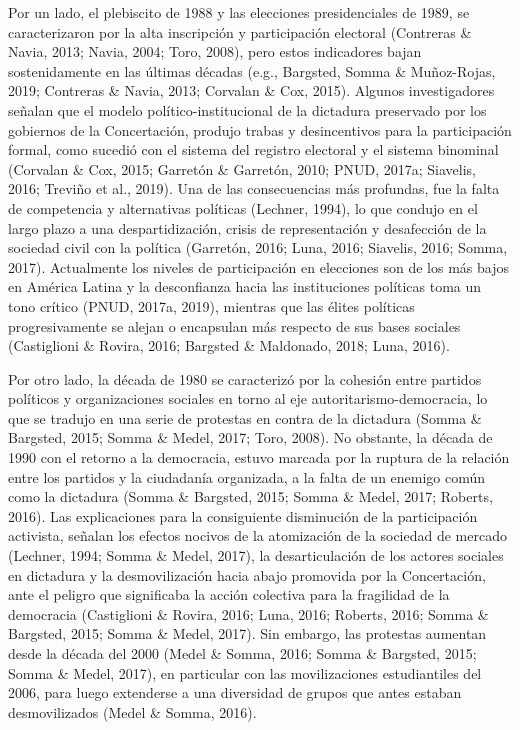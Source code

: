 \documentclass[12pt,twoside]{templates/facsothesis}
\begin{document}
Por un lado, el plebiscito de 1988 y las elecciones presidenciales de 1989, se caracterizaron por la alta inscripción y participación electoral (Contreras \& Navia, 2013; Navia, 2004; Toro, 2008), pero estos indicadores bajan sostenidamente en las últimas décadas (e.g., Bargsted, Somma \& Muñoz-Rojas, 2019; Contreras \& Navia, 2013; Corvalan \& Cox, 2015). Algunos investigadores señalan que el modelo político-institucional de la dictadura preservado por los gobiernos de la Concertación, produjo trabas y desincentivos para la participación formal, como sucedió con el sistema del registro electoral y el sistema binominal (Corvalan \& Cox, 2015; Garretón \& Garretón, 2010; PNUD, 2017a; Siavelis, 2016; Treviño et al., 2019). Una de las consecuencias más profundas, fue la falta de competencia y alternativas políticas (Lechner, 1994), lo que condujo en el largo plazo a una despartidización, crisis de representación y desafección de la sociedad civil con la política (Garretón, 2016; Luna, 2016; Siavelis, 2016; Somma, 2017). Actualmente los niveles de participación en elecciones son de los más bajos en América Latina y la desconfianza hacia las instituciones políticas toma un tono crítico (PNUD, 2017a, 2019), mientras que las élites políticas progresivamente se alejan o encapsulan más respecto de sus bases sociales (Castiglioni \& Rovira, 2016; Bargsted \& Maldonado, 2018; Luna, 2016).

Por otro lado, la década de 1980 se caracterizó por la cohesión entre partidos políticos y organizaciones sociales en torno al eje autoritarismo-democracia, lo que se tradujo en una serie de protestas en contra de la dictadura (Somma \& Bargsted, 2015; Somma \& Medel, 2017; Toro, 2008). No obstante, la década de 1990 con el retorno a la democracia, estuvo marcada por la ruptura de la relación entre los partidos y la ciudadanía organizada, a la falta de un enemigo común como la dictadura (Somma \& Bargsted, 2015; Somma \& Medel, 2017; Roberts, 2016). Las explicaciones para la consiguiente disminución de la participación activista, señalan los efectos nocivos de la atomización de la sociedad de mercado (Lechner, 1994; Somma \& Medel, 2017), la desarticulación de los actores sociales en dictadura y la desmovilización hacia abajo promovida por la Concertación, ante el peligro que significaba la acción colectiva para la fragilidad de la democracia (Castiglioni \& Rovira, 2016; Luna, 2016; Roberts, 2016; Somma \& Bargsted, 2015; Somma \& Medel, 2017). Sin embargo, las protestas aumentan desde la década del 2000 (Medel \& Somma, 2016; Somma \& Bargsted, 2015; Somma \& Medel, 2017), en particular con las movilizaciones estudiantiles del 2006, para luego extenderse a una diversidad de grupos que antes estaban desmovilizados (Medel \& Somma, 2016).
\end{document}
